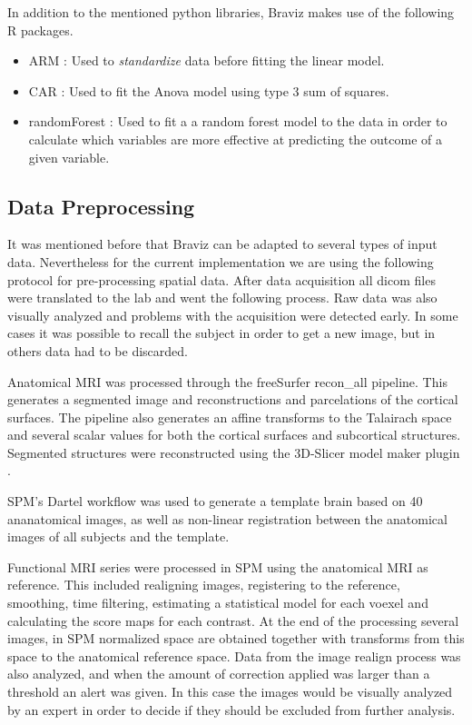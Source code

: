 In addition to the mentioned python libraries, Braviz makes use of the following R packages.

\begin{itemize}
\item ARM \autocite{gelman_arm:_2015}: Used to \emph{standardize} data before fitting the linear model.
\item CAR \autocite{fox_car:_2015}: Used to fit the Anova model using type 3 sum of squares.
\item randomForest \autocite{cutler_randomforest:_2014}: Used to fit a a random forest model to the data in order to calculate which variables are more effective at predicting the outcome of a given variable.
\end{itemize}

\subsection{Data Preprocessing}
\label{sec_preproc}
It was mentioned before that Braviz can be adapted to several types of input data. Nevertheless for the current implementation we are using the following protocol for pre-processing spatial data. After data acquisition all dicom files were translated to the lab and went the following process. Raw data was also visually analyzed and problems with the acquisition were detected early. In some cases it was possible to recall the subject in order to get a new image, but in others data had to be discarded.

Anatomical MRI was processed through the freeSurfer \autocite{dale_cortical_1999} recon\_all pipeline. This generates a segmented image and reconstructions and parcelations of the cortical surfaces. The pipeline also generates an affine transforms to the Talairach space and several scalar values for both the cortical surfaces and subcortical structures. Segmented structures were reconstructed using the 3D-Slicer model maker plugin \autocite{aucoin_modelmaker_2014}. 

SPM's Dartel \autocite{ashburner_fast_2007} workflow was used to generate a template brain based on 40 ananatomical images, as well as non-linear registration between the anatomical images of all subjects and the template. 

Functional MRI series were processed in SPM \autocite{friston_statistical_2006} using the anatomical MRI as reference. This included realigning images, registering to the reference, smoothing, time filtering, estimating a statistical model for each voexel and calculating the score maps for each contrast. At the end of the processing several images, in SPM normalized space are obtained together with transforms from this space to the anatomical reference space. Data from the image realign process was also analyzed, and when the amount of correction applied was larger than a threshold an alert was given. In this case the images would be visually analyzed by an expert in order to decide if they should be excluded from further  analysis.

